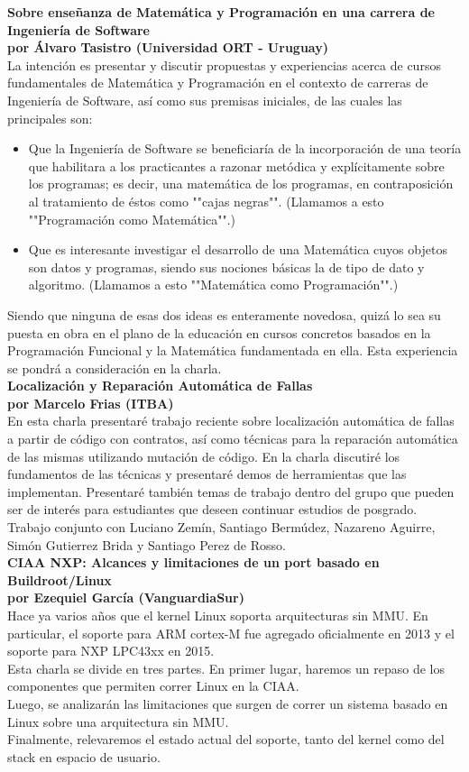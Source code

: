 \documentclass[12pt, a4paper]{article}
\newcommand{\charla}[3]{
	{\large\bf#1}\\
	{\bf por #2}\\
	#3\\
}
\begin{document}
\charla
{Sobre enseñanza de Matemática y Programación en una carrera de Ingeniería de Software}
{Álvaro Tasistro (Universidad ORT - Uruguay)}
{La intención es presentar y discutir propuestas y experiencias acerca de cursos fundamentales de Matemática y Programación en el contexto de carreras de Ingeniería de Software, así como sus premisas iniciales, de las cuales las principales son:
\begin{itemize}
\item Que la Ingeniería de Software se beneficiaría de la incorporación de una teoría que habilitara a los practicantes a razonar metódica y explícitamente sobre los programas; es decir, una matemática de los programas, en contraposición al tratamiento de éstos como ""cajas negras"". (Llamamos a esto ""Programación como Matemática"".)
\item Que es interesante investigar el desarrollo de una Matemática cuyos objetos son datos y programas, siendo sus nociones básicas la de tipo de dato y algoritmo. (Llamamos a esto ""Matemática como Programación"".)
\end{itemize}
Siendo que ninguna de esas dos ideas es enteramente novedosa, quizá lo sea su puesta en obra en el plano de la educación en cursos concretos basados en la Programación Funcional y la Matemática fundamentada en ella. Esta experiencia se pondrá a consideración en la charla.}

\charla
{Localización y Reparación Automática de Fallas}
{Marcelo Frias (ITBA)}
{En esta charla presentaré trabajo reciente sobre localización automática de fallas a partir de código con contratos, así como técnicas para la reparación automática de las mismas utilizando mutación de código. En la charla discutiré los fundamentos de las técnicas y presentaré demos de herramientas que las implementan. Presentaré también temas de trabajo dentro del grupo que pueden ser de interés para estudiantes que deseen continuar estudios de posgrado. \\
Trabajo conjunto con Luciano Zemín, Santiago Bermúdez, Nazareno Aguirre, Simón Gutierrez Brida y Santiago Perez de Rosso.}

\charla
{CIAA NXP: Alcances y limitaciones de un port basado en Buildroot/Linux}
{Ezequiel García (VanguardiaSur)}
{Hace ya varios años que el kernel Linux soporta arquitecturas sin MMU. En particular, el soporte para ARM cortex-M fue agregado oficialmente en 2013 y el soporte para NXP LPC43xx en 2015. \\
Esta charla se divide en tres partes. En primer lugar, haremos un repaso de los componentes que permiten correr Linux en la CIAA. \\
Luego, se analizarán las limitaciones que surgen de correr un sistema basado en Linux sobre una arquitectura sin MMU. \\
Finalmente, relevaremos el estado actual del soporte, tanto del kernel como del stack en espacio de usuario.}
\end{document}
